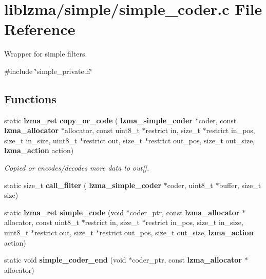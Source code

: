 \section{liblzma/simple/simple\+\_\+coder.c File Reference}
\label{simple__coder_8c}


Wrapper for simple filters.  


{\ttfamily \#include \char`\"{}simple\+\_\+private.\+h\char`\"{}}\newline
\subsection*{Functions}
\begin{DoxyCompactItemize}
\item 
static \textbf{ lzma\+\_\+ret} \textbf{ copy\+\_\+or\+\_\+code} (\textbf{ lzma\+\_\+simple\+\_\+coder} $\ast$coder, const \textbf{ lzma\+\_\+allocator} $\ast$allocator, const uint8\+\_\+t $\ast$restrict in, size\+\_\+t $\ast$restrict in\+\_\+pos, size\+\_\+t in\+\_\+size, uint8\+\_\+t $\ast$restrict out, size\+\_\+t $\ast$restrict out\+\_\+pos, size\+\_\+t out\+\_\+size, \textbf{ lzma\+\_\+action} action)
\begin{DoxyCompactList}\small\item\em Copied or encodes/decodes more data to out[]. \end{DoxyCompactList}\item 
\mbox{\label{simple__coder_8c_a5dcd9f9ca1137aafe4732eaed2587185}} 
static size\+\_\+t {\bfseries call\+\_\+filter} (\textbf{ lzma\+\_\+simple\+\_\+coder} $\ast$coder, uint8\+\_\+t $\ast$buffer, size\+\_\+t size)
\item 
\mbox{\label{simple__coder_8c_a0e3d6e1cc6020bfce449ebbf556d3a8a}} 
static \textbf{ lzma\+\_\+ret} {\bfseries simple\+\_\+code} (void $\ast$coder\+\_\+ptr, const \textbf{ lzma\+\_\+allocator} $\ast$allocator, const uint8\+\_\+t $\ast$restrict in, size\+\_\+t $\ast$restrict in\+\_\+pos, size\+\_\+t in\+\_\+size, uint8\+\_\+t $\ast$restrict out, size\+\_\+t $\ast$restrict out\+\_\+pos, size\+\_\+t out\+\_\+size, \textbf{ lzma\+\_\+action} action)
\item 
\mbox{\label{simple__coder_8c_acaa632e05595edc2e512d49aa9a0eb6e}} 
static void {\bfseries simple\+\_\+coder\+\_\+end} (void $\ast$coder\+\_\+ptr, const \textbf{ lzma\+\_\+allocator} $\ast$allocator)
\item 
\mbox{\label{simple__coder_8c_a08423347f98c0cb8e31aa89427e6ed27}} 

\end{DoxyCompactItemize}
